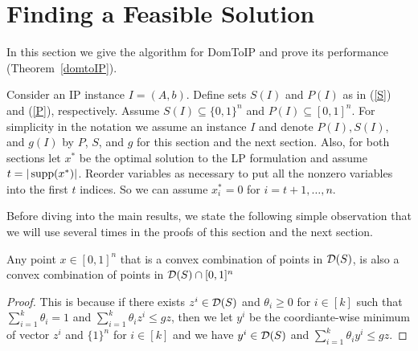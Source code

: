 \section{Finding a Feasible Solution}\label{sec:domTOIP}
In this section we give the algorithm for DomToIP and prove its performance (Theorem~\ref{domtoIP}).

Consider an IP instance $I=(A,b)$. Define sets $S(I)$ and $P(I)$ as in (\ref{S}) and (\ref{P}), respectively. Assume $S(I)\subseteq \{0,1\}^n$ and $P(I)\subseteq [0,1]^n$. For simplicity in the notation we assume an instance $I$ and denote $P(I),S(I),$ and $g(I)$ by $P$, $S$, and $g$ for this section and the next section. Also, for both sections let $x^*$ be the optimal solution to the LP formulation and assume $t=|\operatorname{supp}(x^*)|$. Reorder variables as necessary to put all the nonzero variables into the first $t$ indices. So we can assume $x^*_i = 0$ for $i=t+1,\ldots,n$.

Before diving into the main results, we state the following simple observation that we will use several times in the proofs of this section and the next section.
\begin{observation}\label{dom01}
Any point $x\in [0,1]^n$ that is a convex combination of points in $\operatorname{\mathcal{D}}(S)$, is also a convex combination of points in $\operatorname{\mathcal{D}}(S) \cap [0,1]^n$
\end{observation}
\begin{proof}
This is because if there exists ${z}^i\in \operatorname{\mathcal{D}}(S)$ and $\theta_i\geq 0$ for $i\in [k]$ such that $\sum_{i=1}^{k} \theta_i = 1$ and $\sum_{i=1}^{k}\theta_i {z}^i \leq gz$, then 
we let ${y}^i$ be the coordiante-wise minimum of vector ${z}^i$ and $\{1\}^n$ for $i\in [k]$ and we have ${y}^i\in \operatorname{\mathcal{D}}(S)$ and $\sum_{i=1}^{k}\theta_i{y}^i \leq gz$.
\end{proof}

